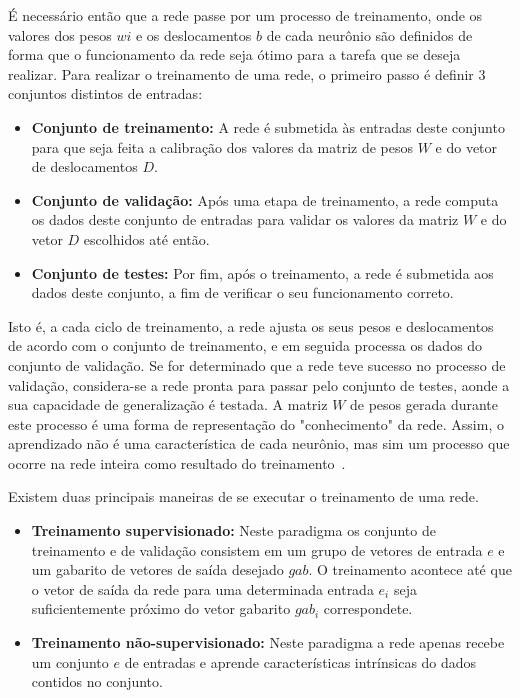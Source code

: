 É necessário então que a rede passe por um processo de treinamento, onde os valores dos pesos $wi$ e os deslocamentos $b$ de cada neurônio são definidos de forma que o funcionamento da rede seja ótimo para a tarefa que se deseja realizar. Para realizar o treinamento de uma rede, o primeiro passo é definir 3 conjuntos distintos de entradas:

\begin{itemize}
	\item \textbf{Conjunto de treinamento:} A rede é submetida às entradas deste conjunto para que seja feita a calibração dos valores da matriz de pesos $W$ e do vetor de deslocamentos $D$.
	
	\item \textbf{Conjunto de validação:} Após uma etapa de treinamento, a rede computa os dados deste conjunto de entradas para validar os valores da matriz $W$ e do vetor $D$ escolhidos até então.
	
	\item \textbf{Conjunto de testes:} Por fim, após o treinamento, a rede é submetida aos dados deste conjunto, a fim de verificar o seu funcionamento correto.
\end{itemize}

Isto é, a cada ciclo de treinamento, a rede ajusta os seus pesos e deslocamentos de acordo com o conjunto de treinamento, e em seguida processa os dados do conjunto de validação. Se for determinado que a rede teve sucesso no processo de validação, considera-se a rede pronta para passar pelo conjunto de testes, aonde a sua capacidade de generalização é testada. A matriz $W$ de pesos gerada durante este processo é uma forma de representação do "conhecimento" da rede. Assim, o aprendizado não é uma característica de cada neurônio, mas sim um processo que ocorre na rede inteira como resultado do treinamento~\cite{Kosabov}.

Existem duas principais maneiras de se executar o treinamento de uma rede.

\begin{itemize}
	\item \textbf{Treinamento supervisionado:} Neste paradigma os conjunto de treinamento e de validação consistem em um grupo de vetores de entrada $e$ e um gabarito de vetores de saída desejado $gab$. O treinamento acontece até que o vetor de saída da rede para uma determinada entrada $e_i$ seja suficientemente próximo do vetor gabarito $gab_i$ correspondete.
	
	
	\item \textbf{Treinamento não-supervisionado:} Neste paradigma a rede apenas recebe um conjunto $e$ de entradas e aprende características intrínsicas do dados contidos no conjunto.
	
\end{itemize}

